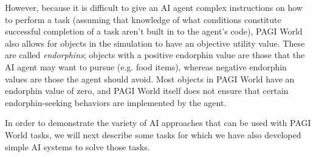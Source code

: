 However, because it is difficult to give an AI agent complex instructions on how to perform a task (assuming that knowledge of what conditions constitute successful completion of a task aren't built in to the agent's code), PAGI World also allows for objects in the simulation to have an objective utility value. These are called \textit{endorphins}; objects with a positive endorphin value are those that the AI agent may want to pursue (e.g. food items), whereas negative endorphin values are those the agent should avoid. Most objects in PAGI World have an endorphin value of zero, and PAGI World itself does not ensure that certain endorphin-seeking behaviors are implemented by the agent. 



In order to demonstrate the variety of AI approaches that can be used with PAGI World tasks, we will next describe some tasks for which we have also developed simple AI systems to solve those tasks. 



